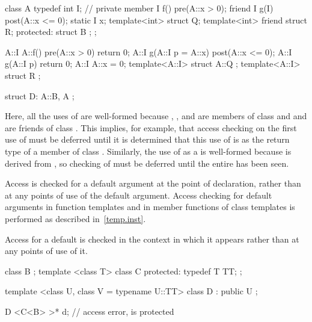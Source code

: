 \pnum
\begin{example}
\begin{codeblock}
class A {
  typedef int I;    // private member
  I f() pre(A::x > 0);
  friend I g(I) post(A::x <= 0);
  static I x;
  template<int> struct Q;
  template<int> friend struct R;
protected:
    struct B { };
};

A::I A::f() pre(A::x > 0) { return 0; }
A::I g(A::I p = A::x) post(A::x <= 0);
A::I g(A::I p) { return 0; }
A::I A::x = 0;
template<A::I> struct A::Q { };
template<A::I> struct R { };

struct D: A::B, A { };
\end{codeblock}

Here, all the uses of
are well-formed because
,
, and 
are members of class
and
and  are friends of class
.
This implies, for example, that access checking on the first use of
must be deferred until it is determined that this use of
is as the return type of a member of class
.
Similarly, the use of  as a
 is well-formed because 
is derived from , so checking of 
must be deferred until the entire  has been seen.
\end{example}

\pnum
{}%
%
Access is checked for a default argument
at the point of declaration,
rather than at any points of use of the default argument.
Access checking for default arguments in function templates and in
member functions of class templates is performed as described in~\ref{temp.inst}.

\pnum
Access for a default 
is checked in the context in which it appears rather than at any
points of use of it.
\begin{example}
\begin{codeblock}
class B { };
template <class T> class C {
protected:
  typedef T TT;
};

template <class U, class V = typename U::TT>
class D : public U { };

D <C<B> >* d;       // access error,  is protected
\end{codeblock}
\end{example}

